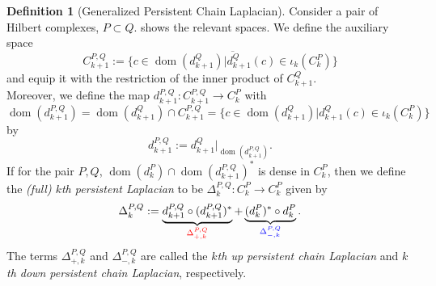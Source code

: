 \documentclass[11pt]{article}
\theoremstyle{definition}
\newtheorem{definition}[theorem]{Definition}
\theoremstyle{remark}
\DeclareMathOperator\dom{dom}
\newcommand{\red}[1]{\textcolor{red}{#1}}
\begin{document}
\begin{definition}[Generalized Persistent Chain Laplacian]
\label{def:pers_chain_lap}
    Consider a pair of Hilbert complexes, $P \subset Q$.  shows the relevant spaces. We define the auxiliary space 
    $$
    C^{P,Q}_{k+1} := \overline{\{c \in \dom(d^{Q}_{k+1}) | d^{Q}_{k+1}(c) \in \iota_k(C^{P}_k)\}}
    $$
    and equip it with the restriction of the inner product of $C^{Q}_{k+1}$.\\
    Moreover, we define the map $d^{P,Q}_{k+1}:C^{P,Q}_{k+1} \rightarrow C_k^P$ 
    with
    $$
    \dom(d^{P,Q}_{k+1})=\dom(d^Q_{k+1})\cap C^{P,Q}_{k+1}=\{c \in \dom(d^{Q}_{k+1}) | d^{Q}_{k+1}(c) \in \iota_k(C^{P}_k)\}
    $$
    by
    $$
    d^{P,Q}_{k+1} := d^{Q}_{k+1}|_{\dom(d^{P,Q}_{k+1})}.
    $$
    If for the pair $P,Q$, $\dom(d_k^P) \cap \dom(d_{k+1}^{P,Q})^*$ is dense in $C_k^P$, then we define the \emph{(full) $k$th persistent Laplacian} to be $\Delta^{P,Q}_k : C^{P}_k \to C^{P}_k$ given by 
\[
\Delta^{P,Q}_k := \underbrace{d^{P,Q}_{k+1} \circ (d^{P,Q}_{k+1})^{*}}_{\red{\Delta^{P,Q}_{+, k}}} + \underbrace{(d^{P}_k)^{*} \circ d^{P}_k}_{\textcolor{blue}{\Delta^{P,Q}_{-, k}}}.
\]
The terms $\Delta^{P,Q}_{+, k}$ and $\Delta^{P,Q}_{-, k}$ are called the \emph{$k$th up persistent chain Laplacian} and \emph{$k$th down persistent chain Laplacian}, respectively.
\end{definition}
\end{document}
